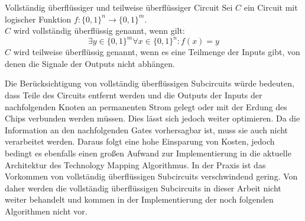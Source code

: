 \documentclass[11pt, a4paper, german]{article}
\newcommand{\TM}{Technology  Mapping }
\begin{document}
 \begin{definition}{Vollständig überflüssiger und teilweise überflüssiger Circuit }
 	Sei $C$ ein Circuit mit logischer Funktion $ f : \{ 0 , 1 \}^n \rightarrow \{ 0 , 1 \}^m $.\\
 	$C$ wird vollständig überflüssig genannt, wenn gilt:
 	\[  \exists y \in \{0,1 \}^m \forall x \in \{ 0, 1\}^n : f(x) = y  \]
 	$C$ wird teilweise überflüssig genannt, wenn es eine Teilmenge der Inputs gibt, von denen die Signale der Outputs nicht abhängen.
 \end{definition}
 
Die Berücksichtigung von vollständig überflüssigen Subcircuits würde bedeuten, dass Teile des Circuits entfernt werden und die Outputs der Inputs der nachfolgenden Knoten an permanenten Strom gelegt oder mit der Erdung des Chips verbunden werden müssen. Dies lässt sich jedoch weiter optimieren. Da die Information an den nachfolgenden Gates vorhersagbar ist, muss sie auch nicht verarbeitet werden. Daraus folgt eine hohe Einsparung von Kosten, jedoch bedingt es ebenfalls einen großen Aufwand zur Implementierung in die aktuelle Architektur des \TM Algorithmus. In der Praxis ist das Vorkommen von  vollständig überflüssigen Subcircuits verschwindend gering. Von daher werden die vollständig überflüssigen Subcircuits in dieser Arbeit nicht weiter behandelt und kommen in der Implementierung der noch folgenden Algorithmen nicht vor. \\
 
\end{document}
